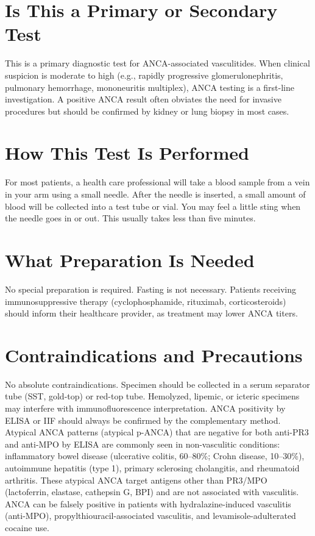\section*{Is This a Primary or Secondary Test}
This is a primary diagnostic test for ANCA-associated vasculitides. When clinical suspicion is moderate to high (e.g., rapidly progressive glomerulonephritis, pulmonary hemorrhage, mononeuritis multiplex), ANCA testing is a first-line investigation. A positive ANCA result often obviates the need for invasive procedures but should be confirmed by kidney or lung biopsy in most cases.

\section*{How This Test Is Performed}
For most patients, a health care professional will take a blood sample from a vein in your arm using a small needle. After the needle is inserted, a small amount of blood will be collected into a test tube or vial. You may feel a little sting when the needle goes in or out. This usually takes less than five minutes.

\section*{What Preparation Is Needed}
No special preparation is required. Fasting is not necessary. Patients receiving immunosuppressive therapy (cyclophosphamide, rituximab, corticosteroids) should inform their healthcare provider, as treatment may lower ANCA titers.

\section*{Contraindications and Precautions}
No absolute contraindications. Specimen should be collected in a serum separator tube (SST, gold-top) or red-top tube. Hemolyzed, lipemic, or icteric specimens may interfere with immunofluorescence interpretation. ANCA positivity by ELISA or IIF should always be confirmed by the complementary method. Atypical ANCA patterns (atypical p-ANCA) that are negative for both anti-PR3 and anti-MPO by ELISA are commonly seen in non-vasculitic conditions: inflammatory bowel disease (ulcerative colitis, 60--80\%; Crohn disease, 10--30\%), autoimmune hepatitis (type 1), primary sclerosing cholangitis, and rheumatoid arthritis. These atypical ANCA target antigens other than PR3/MPO (lactoferrin, elastase, cathepsin G, BPI) and are not associated with vasculitis. ANCA can be falsely positive in patients with hydralazine-induced vasculitis (anti-MPO), propylthiouracil-associated vasculitis, and levamisole-adulterated cocaine use.

